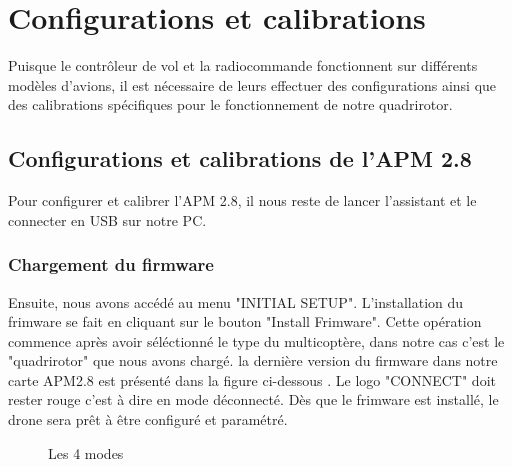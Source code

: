 	
	\section{Configurations et calibrations}
	Puisque le contrôleur de vol et la radiocommande fonctionnent sur différents modèles d'avions, il est nécessaire de leurs effectuer des configurations  ainsi que  des calibrations spécifiques pour le fonctionnement de notre quadrirotor. 
	\subsection{Configurations et calibrations de l'APM 2.8}
	Pour configurer et calibrer l'APM 2.8, il nous reste  de lancer l’assistant et le connecter en USB sur notre PC.
	\subsubsection{Chargement du firmware }
	Ensuite, nous avons accédé au menu "INITIAL SETUP". L'installation du frimware se fait en cliquant sur le bouton "Install Frimware". Cette opération commence après avoir séléctionné le type du multicoptère, dans notre cas c'est le "quadrirotor" que nous avons chargé.  la dernière version du firmware dans
	notre carte APM2.8 est présenté dans la figure ci-dessous . Le logo "CONNECT" doit rester rouge c'est à dire en mode déconnecté. Dès que le frimware est installé, le drone sera prêt à être configuré et paramétré.
	\begin{figure}[h]
		\begin{center}
			\centering
		\end{center}
		\caption{Les 4 modes}
	\end{figure}
	
